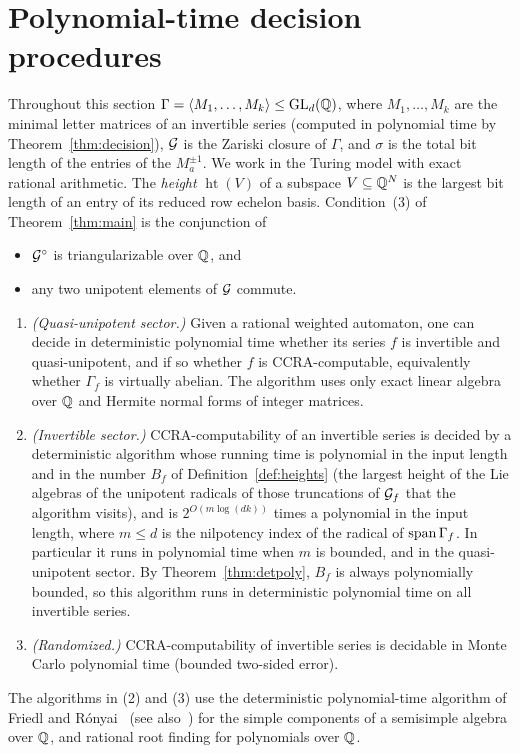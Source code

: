 \section{Polynomial-time decision procedures}\label{sec:polytime}

Throughout this section $\Gamma=\langle M_1,\ldots,M_k\rangle\le\mathrm{GL}_d(\mathbb{Q})$, where
$M_1,\ldots,M_k$ are the minimal letter matrices of an invertible series (computed in
polynomial time by Theorem~\ref{thm:decision}), $\mathcal{G}$ is the Zariski closure of $\Gamma$, and
$\sigma$ is the total bit length of the entries of the $M_a^{\pm1}$. We work in the Turing model
with exact rational arithmetic. The \emph{height} $\operatorname{ht}(V)$ of a subspace
$V\subseteq\mathbb{Q}^N$ is the largest bit length of an entry of its reduced row echelon basis.
Condition~(3) of Theorem~\ref{thm:main} is the conjunction of
\begin{itemize}
\item[(a)] $\mathcal{G}^\circ$ is triangularizable over $\mathbb{Q}$, and
\item[(b)] any two unipotent elements of $\mathcal{G}$ commute.
\end{itemize}

\begin{theorem}\label{thm:polytime}
\begin{enumerate}
\item \emph{(Quasi-unipotent sector.)} Given a rational weighted automaton, one can decide in
deterministic polynomial time whether its series $f$ is invertible and quasi-unipotent, and if
so whether $f$ is CCRA-computable, equivalently whether $\Gamma_f$ is virtually abelian. The
algorithm uses only exact linear algebra over $\mathbb{Q}$ and Hermite normal forms of integer matrices.
\item \emph{(Invertible sector.)} CCRA-computability of an invertible series is decided by a
deterministic algorithm whose running time is polynomial in the input length and in the number
$B_f$ of Definition~\ref{def:heights} (the largest height of the Lie algebras of the unipotent
radicals of those truncations of $\mathcal{G}_f$ that the algorithm visits), and is $2^{O(m\log(dk))}$ times a polynomial in the input
length, where $m\le d$ is the nilpotency index of the radical of $\operatorname{span}\Gamma_f$. In
particular it runs in polynomial time when $m$ is bounded, and in the quasi-unipotent sector. By
Theorem~\ref{thm:detpoly}, $B_f$ is always polynomially bounded, so this algorithm runs in
deterministic polynomial time on all invertible series.
\item \emph{(Randomized.)} CCRA-computability of invertible series is decidable in Monte Carlo
polynomial time (bounded two-sided error).
\end{enumerate}
The algorithms in (2) and (3) use the deterministic polynomial-time algorithm of Friedl and
R\'onyai~\cite{FR85} (see also~\cite[Theorem~2.6]{Bea99}) for the simple components of a
semisimple algebra over $\mathbb{Q}$, and rational root finding for polynomials over $\mathbb{Q}$.
\end{theorem}

